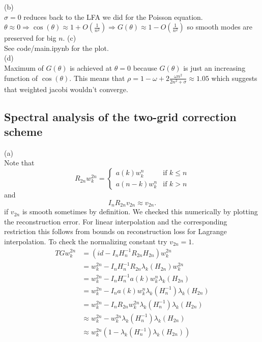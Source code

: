 \documentclass[a4paper,12pt]{article}
\begin{document}
(b) \\
$\sigma = 0$ reduces back to the LFA we did for the Poisson equation.
$\theta \approx 0 \Rightarrow \cos(\theta)
    \approx 1 + O \left(\frac{1}{n^{2}}\right) \Rightarrow G(\theta) \approx 1 - O \left(\frac{1}{n^{2}}\right)$
so smooth modes are preserved for big $n$.
(c) \\
See code/main.ipynb for the plot. \\

(d)\\
Maximum of $G(\theta)$ is achieved at $\theta =0$ because $G(\theta)$ is just
an increasing function of $\cos(\theta)$. This means that
$\rho = 1-\omega + 2 \frac{\omega n^{2}}{2 n^{2} + \sigma}  \approx 1.05 $
which suggests that weighted jacobi wouldn't converge.


\subsection{Spectral analysis of the two-grid correction scheme}
(a) \\
Note that
\begin{equation}
    R_{2n} w_{k}^{2n} =
    \begin{cases}
        a(k) w_{k}^{n}   & \text{if } k \leq n \\
        a(n-k) w_{k}^{n} & \text{if } k > n
    \end{cases}
\end{equation}
and
\begin{equation}
    I_{n} R_{2n} v_{2n} \approx v_{2n}.
\end{equation}
if $v_{2n}$ is smooth sometimes by definition.
We checked this numerically by plotting the reconstruction error.
For linear interpolation and the corresponding restriction
this follows from bounds on reconstruction loss for
Lagrange interpolation. To check the normalizing constant try $v_{2n} = 1$. \\

\begin{align*}
    TG w_{k}^{2n} & = (id - I_{n} H_{n}^{-1} R_{2n} H_{2n}) w_{k}^{2n}                                    \\
                  & =  w_{k}^{2n} - I_{n} H_{n}^{-1} R_{2n} \lambda_{k}(H_{2n}) w_{k}^{2n}                \\
                  & =  w_{k}^{2n} - I_{n} H_{n}^{-1}  a(k) w_{k}^{n} \lambda_{k}(H_{2n})                  \\
                  & =  w_{k}^{2n} - I_{n}  a(k) w_{k}^{n} \lambda_{k}(H_{n}^{-1})  \lambda_{k}(H_{2n})    \\
                  & =  w_{k}^{2n} - I_{n}  R_{2n} w_{k}^{2n} \lambda_{k}(H_{n}^{-1})  \lambda_{k}(H_{2n}) \\
                  & \approx  w_{k}^{2n} -  w_{k}^{2n} \lambda_{k}(H_{n}^{-1})  \lambda_{k}(H_{2n})        \\
                  & \approx  w_{k}^{2n} (1-   \lambda_{k}(H_{n}^{-1})  \lambda_{k}(H_{2n}))
\end{align*}
\end{document}
